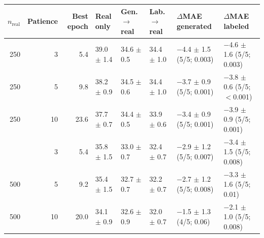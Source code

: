 \begin{tabular}{@{}rrrlllll@{}}
\toprule
$n_\mathrm{real}$ & Patience & Best epoch & Real only & Gen.\,$\rightarrow$\,real & Lab.\,$\rightarrow$\,real & $\Delta$MAE generated & $\Delta$MAE labeled \\
\midrule
250 & 3 & 5.4 & 39.0 $\pm$ 1.4 & 34.6 $\pm$ 0.5 & 34.4 $\pm$ 1.0 & \num{-4.4} $\pm$ 1.5 (5/5; 0.003) & \num{-4.6} $\pm$ 1.6 (5/5; 0.003) \\
250 & 5 & 9.8 & 38.2 $\pm$ 0.9 & 34.5 $\pm$ 0.6 & 34.4 $\pm$ 1.0 & \num{-3.7} $\pm$ 0.9 (5/5; 0.001) & \num{-3.8} $\pm$ 0.6 (5/5; $<$0.001) \\
250 & 10 & 23.6 & 37.7 $\pm$ 0.7 & 34.4 $\pm$ 0.5 & 33.9 $\pm$ 0.6 & \num{-3.4} $\pm$ 0.9 (5/5; 0.001) & \num{-3.9} $\pm$ 0.9 (5/5; 0.001) \\
\addlinespace
500 & 3 & 5.4 & 35.8 $\pm$ 1.5 & 33.0 $\pm$ 0.7 & 32.4 $\pm$ 0.7 & \num{-2.9} $\pm$ 1.2 (5/5; 0.007) & \num{-3.4} $\pm$ 1.5 (5/5; 0.008) \\
500 & 5 & 9.2 & 35.4 $\pm$ 1.5 & 32.7 $\pm$ 0.7 & 32.2 $\pm$ 0.7 & \num{-2.7} $\pm$ 1.2 (5/5; 0.008) & \num{-3.3} $\pm$ 1.6 (5/5; 0.01) \\
500 & 10 & 20.0 & 34.1 $\pm$ 0.9 & 32.6 $\pm$ 0.9 & 32.0 $\pm$ 0.7 & \num{-1.5} $\pm$ 1.3 (4/5; 0.06) & \num{-2.1} $\pm$ 1.0 (5/5; 0.008) \\
\bottomrule
\end{tabular}
